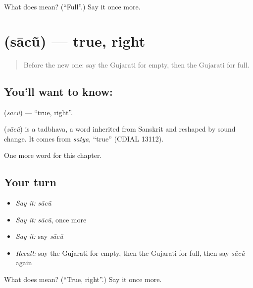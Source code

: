 \begin{tcolorbox}[breakable,colback=teal!4,colframe=teal!35!black,title={Before you move on}]
What does  mean? (\textquotedblleft{}Full\textquotedblright{}.) Say it once more.
\end{tcolorbox}
\section[\texorpdfstring{\gu{સાચું} (sācũ)}{સાચું (sācũ)}]{ (sācũ) — true, right}

\label{lesson:GU-C136-sacu}



\begin{quote}
Before the new one: say the Gujarati for empty, then the Gujarati for full.
\end{quote}

\subsection*{You'll want to know: }
\textbf{} (\emph{sācũ}) — \textquotedblleft{}true, right\textquotedblright{}.

\begin{cousinweb}
\textbf{} (\emph{sācũ}) is a tadbhava, a word inherited from Sanskrit and reshaped by sound change. It comes from \emph{satya}, \textquotedblleft{}true\textquotedblright{} (CDIAL 13112).
\end{cousinweb}

\begin{grammarlens}[title={What you've built}]
One more word for this chapter.
\end{grammarlens}

\subsection*{Your turn}
\begin{itemize}
\raggedright
  \item \emph{Say it:} \emph{sācũ}
  \item \emph{Say it:} \emph{sācũ}, once more
  \item \emph{Say it:} say \emph{sācũ}
  \item \emph{Recall:} say the Gujarati for empty, then the Gujarati for full, then say \emph{sācũ} again
\end{itemize}

\begin{tcolorbox}[breakable,colback=teal!4,colframe=teal!35!black,title={Before you move on}]
What does  mean? (\textquotedblleft{}True, right\textquotedblright{}.) Say it once more.
\end{tcolorbox}
